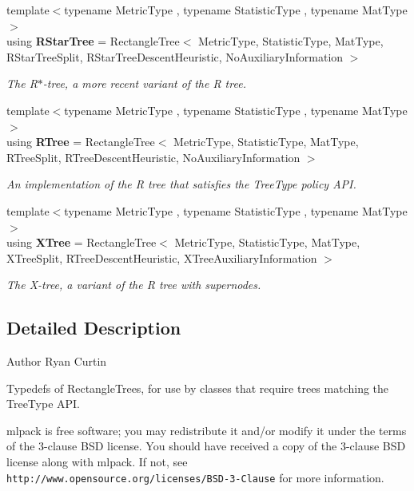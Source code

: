 \begin{DoxyCompactItemize}
{\footnotesize template$<$typename Metric\+Type , typename Statistic\+Type , typename Mat\+Type $>$ }\\using \textbf{ R\+Star\+Tree} = Rectangle\+Tree$<$ Metric\+Type, Statistic\+Type, Mat\+Type, R\+Star\+Tree\+Split, R\+Star\+Tree\+Descent\+Heuristic, No\+Auxiliary\+Information $>$
\begin{DoxyCompactList}\small\item\em The R$\ast$-\/tree, a more recent variant of the R tree. \end{DoxyCompactList}\item 
{\footnotesize template$<$typename Metric\+Type , typename Statistic\+Type , typename Mat\+Type $>$ }\\using \textbf{ R\+Tree} = Rectangle\+Tree$<$ Metric\+Type, Statistic\+Type, Mat\+Type, R\+Tree\+Split, R\+Tree\+Descent\+Heuristic, No\+Auxiliary\+Information $>$
\begin{DoxyCompactList}\small\item\em An implementation of the R tree that satisfies the Tree\+Type policy A\+PI. \end{DoxyCompactList}\item 
{\footnotesize template$<$typename Metric\+Type , typename Statistic\+Type , typename Mat\+Type $>$ }\\using \textbf{ X\+Tree} = Rectangle\+Tree$<$ Metric\+Type, Statistic\+Type, Mat\+Type, X\+Tree\+Split, R\+Tree\+Descent\+Heuristic, X\+Tree\+Auxiliary\+Information $>$
\begin{DoxyCompactList}\small\item\em The X-\/tree, a variant of the R tree with supernodes. \end{DoxyCompactList}\end{DoxyCompactItemize}


\subsection{Detailed Description}
\begin{DoxyAuthor}{Author}
Ryan Curtin
\end{DoxyAuthor}
Typedefs of Rectangle\+Trees, for use by classes that require trees matching the Tree\+Type A\+PI.

mlpack is free software; you may redistribute it and/or modify it under the terms of the 3-\/clause B\+SD license. You should have received a copy of the 3-\/clause B\+SD license along with mlpack. If not, see {\tt http\+://www.\+opensource.\+org/licenses/\+B\+S\+D-\/3-\/\+Clause} for more information. 